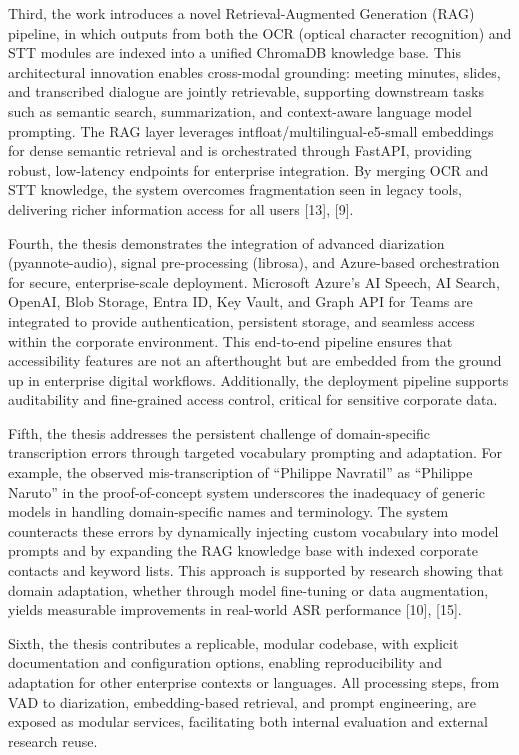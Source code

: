 \documentclass[12pt,a4paper]{article}
\begin{document}
Third, the work introduces a novel Retrieval-Augmented Generation (RAG) pipeline, in which outputs from both the OCR (optical character recognition) and STT modules are indexed into a unified ChromaDB knowledge base. This architectural innovation enables cross-modal grounding: meeting minutes, slides, and transcribed dialogue are jointly retrievable, supporting downstream tasks such as semantic search, summarization, and context-aware language model prompting. The RAG layer leverages intfloat/multilingual-e5-small embeddings for dense semantic retrieval and is orchestrated through FastAPI, providing robust, low-latency endpoints for enterprise integration. By merging OCR and STT knowledge, the system overcomes fragmentation seen in legacy tools, delivering richer information access for all users [13], [9].


Fourth, the thesis demonstrates the integration of advanced diarization (pyannote-audio), signal pre-processing (librosa), and Azure-based orchestration for secure, enterprise-scale deployment. Microsoft Azure’s AI Speech, AI Search, OpenAI, Blob Storage, Entra ID, Key Vault, and Graph API for Teams are integrated to provide authentication, persistent storage, and seamless access within the corporate environment. This end-to-end pipeline ensures that accessibility features are not an afterthought but are embedded from the ground up in enterprise digital workflows. Additionally, the deployment pipeline supports auditability and fine-grained access control, critical for sensitive corporate data.


Fifth, the thesis addresses the persistent challenge of domain-specific transcription errors through targeted vocabulary prompting and adaptation. For example, the observed mis-transcription of “Philippe Navratil” as “Philippe Naruto” in the proof-of-concept system underscores the inadequacy of generic models in handling domain-specific names and terminology. The system counteracts these errors by dynamically injecting custom vocabulary into model prompts and by expanding the RAG knowledge base with indexed corporate contacts and keyword lists. This approach is supported by research showing that domain adaptation, whether through model fine-tuning or data augmentation, yields measurable improvements in real-world ASR performance [10], [15].


Sixth, the thesis contributes a replicable, modular codebase, with explicit documentation and configuration options, enabling reproducibility and adaptation for other enterprise contexts or languages. All processing steps, from VAD to diarization, embedding-based retrieval, and prompt engineering, are exposed as modular services, facilitating both internal evaluation and external research reuse.
\end{document}
